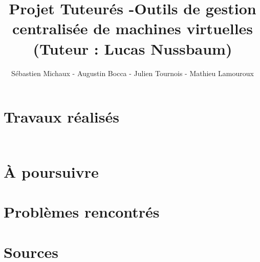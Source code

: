 \documentclass{report}
\begin{document}
\title{Projet Tuteurés -Outils de gestion centralisée de machines virtuelles (Tuteur : Lucas Nussbaum) }
\author{Sébastien Michaux - Augustin Bocca - Julien Tournois - Mathieu Lamouroux}
\date{}
\maketitle
\chapter{Travaux réalisés}
\section{}

\begin{verbatim}

\end{verbatim}

\section{}
\subsection{}

\chapter{À poursuivre}

\chapter{Problèmes rencontrés}

\appendix
\chapter{Sources}
\begin{description}
\item
\item
\end{description}
\end{document}
